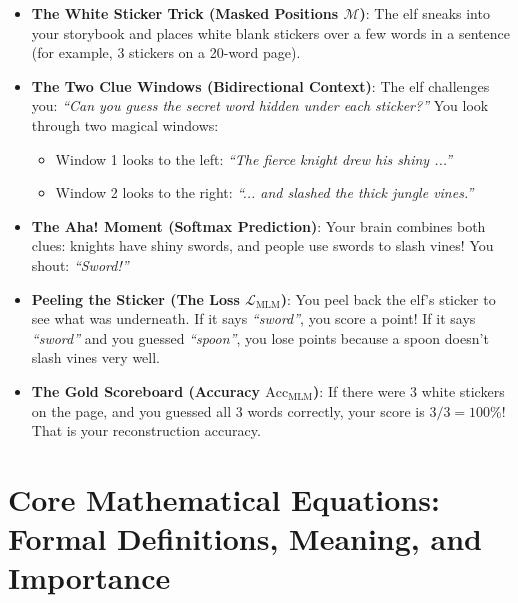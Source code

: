 \documentclass[11pt,a4paper]{article}
\theoremstyle{definition}
\begin{document}
\begin{itemize}
    \item \textbf{The White Sticker Trick (Masked Positions $\mathcal{M}$)}:
    The elf sneaks into your storybook and places white blank stickers over a few words in a sentence (for example, 3 stickers on a 20-word page).
    
    \item \textbf{The Two Clue Windows (Bidirectional Context)}:
    The elf challenges you: \emph{``Can you guess the secret word hidden under each sticker?''}
    You look through two magical windows:
    \begin{itemize}
        \item Window 1 looks to the left: \emph{``The fierce knight drew his shiny ...''}
        \item Window 2 looks to the right: \emph{``... and slashed the thick jungle vines.''}
    \end{itemize}
    
    \item \textbf{The Aha! Moment (Softmax Prediction)}:
    Your brain combines both clues: knights have shiny swords, and people use swords to slash vines! You shout: \emph{``Sword!''}
    
    \item \textbf{Peeling the Sticker (The Loss $\mathcal{L}_{\text{MLM}}$)}:
    You peel back the elf's sticker to see what was underneath. If it says \emph{``sword''}, you score a point! If it says \emph{``sword''} and you guessed \emph{``spoon''}, you lose points because a spoon doesn't slash vines very well.
    
    \item \textbf{The Gold Scoreboard (Accuracy $\text{Acc}_{\text{MLM}}$)}:
    If there were 3 white stickers on the page, and you guessed all 3 words correctly, your score is $3/3 = 100\%$! That is your reconstruction accuracy.
\end{itemize}

\section{Core Mathematical Equations: Formal Definitions, Meaning, and Importance}
\end{document}
